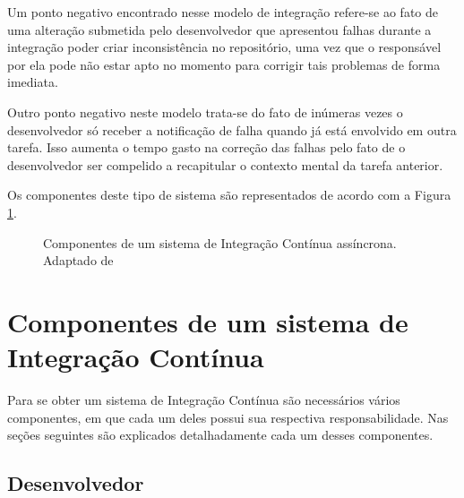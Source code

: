 Um ponto negativo encontrado nesse modelo de integração refere-se ao fato de uma alteração submetida pelo desenvolvedor que apresentou falhas durante a integração poder criar inconsistência no repositório, uma vez que o responsável por ela pode não estar apto no momento para corrigir tais problemas de forma imediata.

Outro ponto negativo neste modelo trata-se do fato de inúmeras vezes o desenvolvedor só receber a notificação de falha quando já está envolvido em outra tarefa. Isso aumenta o tempo gasto na correção das falhas pelo fato de o desenvolvedor ser compelido a recapitular o contexto mental da tarefa anterior.

Os componentes deste tipo de sistema são representados de acordo com a Figura \ref{componentes}.

\begin{figure}[ht]
    \centering
    \caption{Componentes de um sistema de Integração Contínua assíncrona. Adaptado de \cite{DUVALL}}
    \label{componentes}
\end{figure}

\section{Componentes de um sistema de Integração Contínua}

Para se obter um sistema de Integração Contínua são necessários vários componentes, em que cada um deles possui sua respectiva responsabilidade. Nas seções seguintes são explicados detalhadamente cada um desses componentes.

\subsection{Desenvolvedor}

